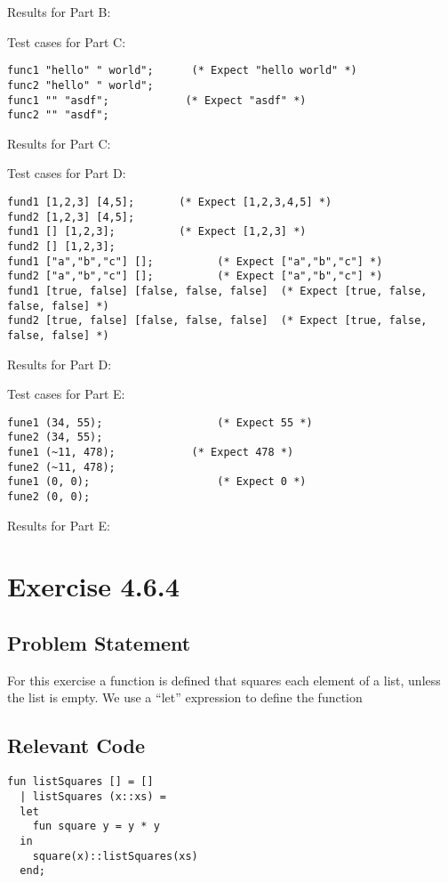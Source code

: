 \documentclass[letterpaper]{report}
\begin{document}
Results for Part B:


Test cases for Part C:
\begin{lstlisting}
func1 "hello" " world";      (* Expect "hello world" *)
func2 "hello" " world";
func1 "" "asdf";            (* Expect "asdf" *)
func2 "" "asdf";
\end{lstlisting}

Results for Part C:


Test cases for Part D:
\begin{lstlisting}
fund1 [1,2,3] [4,5];       (* Expect [1,2,3,4,5] *)
fund2 [1,2,3] [4,5];
fund1 [] [1,2,3];          (* Expect [1,2,3] *)
fund2 [] [1,2,3];
fund1 ["a","b","c"] [];          (* Expect ["a","b","c"] *)
fund2 ["a","b","c"] [];          (* Expect ["a","b","c"] *)
fund1 [true, false] [false, false, false]  (* Expect [true, false, false, false] *)
fund2 [true, false] [false, false, false]  (* Expect [true, false, false, false] *)
\end{lstlisting}

Results for Part D:


Test cases for Part E:
\begin{lstlisting}
fune1 (34, 55);	                 (* Expect 55 *)
fune2 (34, 55);
fune1 (~11, 478);	         (* Expect 478 *)
fune2 (~11, 478);
fune1 (0, 0);                    (* Expect 0 *)
fune2 (0, 0);               
\end{lstlisting}

Results for Part E:


\newpage


\chapter{Exercise 4.6.4}
\label{sec:ex-4-6-4}

\section{Problem Statement}
For this exercise a function is defined that squares each element of a list, unless the list is empty. 
We use a ``let'' expression to define the function

\section{Relevant Code}

\begin{lstlisting}
fun listSquares [] = []
  | listSquares (x::xs) = 
  let
    fun square y = y * y
  in
    square(x)::listSquares(xs)
  end;
\end{lstlisting}
\end{document}
